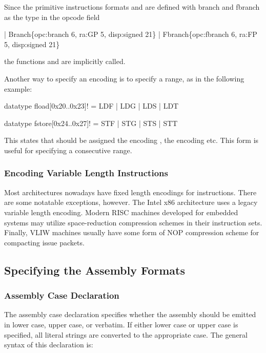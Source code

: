 Since the primitive instructions formats  and 
are defined with branch and fbranch as the type in the opcode field
\begin{SML}
   | Branch\{opc:branch 6, ra:GP 5, disp:signed 21\}          
   | Fbranch\{opc:fbranch 6, ra:FP 5, disp:signed 21\}       
\end{SML}
the functions  and  are implicitly
called.

 
Another way to specify an encoding is to specify a range, as 
in the following example:
\begin{SML}
   datatype fload[0x20..0x23]! = LDF | LDG | LDS | LDT

   datatype fstore[0x24..0x27]! = STF | STG | STS | STT
\end{SML}

This states that  should be assigned the encoding ,
 the encoding  etc.  This form is useful for 
specifying a consecutive range.

\subsubsection{Encoding Variable Length Instructions}

   Most architectures nowadays have fixed length encodings for instructions.  
There are some notatable exceptions, however.  
The Intel x86 architecture uses a legacy
variable length encoding.   Modern RISC machines developed for 
embedded systems may utilize space-reduction compression schemes in their
instruction sets.  Finally, VLIW machines usually have some form
of NOP compression scheme for compacting issue packets. 

\subsection{Specifying the Assembly Formats}

\subsubsection{Assembly Case Declaration}  

  The assembly case declaration specifies whether the assembly should be
emitted in lower case, upper case, or verbatim.  If either lower case
or upper case is specified, all literal strings are converted to the 
appropriate case.  The general syntax of this declaration is:

